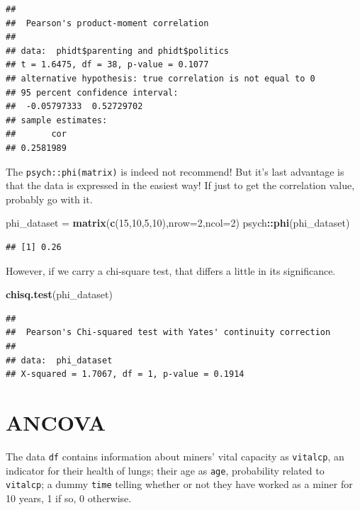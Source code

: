 \documentclass[
]{ctexart}
\newenvironment{Shaded}{\begin{snugshade}}{\end{snugshade}}
\newcommand{\AttributeTok}[1]{\textcolor[rgb]{0.13,0.29,0.53}{#1}}
\newcommand{\DecValTok}[1]{\textcolor[rgb]{0.00,0.00,0.81}{#1}}
\newcommand{\FunctionTok}[1]{\textcolor[rgb]{0.13,0.29,0.53}{\textbf{#1}}}
\newcommand{\NormalTok}[1]{#1}
\newcommand{\OtherTok}[1]{\textcolor[rgb]{0.56,0.35,0.01}{#1}}
\newcommand{\SpecialCharTok}[1]{\textcolor[rgb]{0.81,0.36,0.00}{\textbf{#1}}}
\begin{document}
\begin{verbatim}
## 
##  Pearson's product-moment correlation
## 
## data:  phidt$parenting and phidt$politics
## t = 1.6475, df = 38, p-value = 0.1077
## alternative hypothesis: true correlation is not equal to 0
## 95 percent confidence interval:
##  -0.05797333  0.52729702
## sample estimates:
##       cor 
## 0.2581989
\end{verbatim}

The \texttt{psych::phi(matrix)} is indeed not recommend! But it's last
advantage is that the data is expressed in the easiest way! If just to
get the correlation value, probably go with it.

\begin{Shaded}
\begin{Highlighting}[]
\NormalTok{phi\_dataset }\OtherTok{=} \FunctionTok{matrix}\NormalTok{(}\FunctionTok{c}\NormalTok{(}\DecValTok{15}\NormalTok{,}\DecValTok{10}\NormalTok{,}\DecValTok{5}\NormalTok{,}\DecValTok{10}\NormalTok{),}\AttributeTok{nrow=}\DecValTok{2}\NormalTok{,}\AttributeTok{ncol=}\DecValTok{2}\NormalTok{)}
\NormalTok{psych}\SpecialCharTok{::}\FunctionTok{phi}\NormalTok{(phi\_dataset)}
\end{Highlighting}
\end{Shaded}

\begin{verbatim}
## [1] 0.26
\end{verbatim}

However, if we carry a chi-square test, that differs a little in its
significance.

\begin{Shaded}
\begin{Highlighting}[]
\FunctionTok{chisq.test}\NormalTok{(phi\_dataset)}
\end{Highlighting}
\end{Shaded}

\begin{verbatim}
## 
##  Pearson's Chi-squared test with Yates' continuity correction
## 
## data:  phi_dataset
## X-squared = 1.7067, df = 1, p-value = 0.1914
\end{verbatim}

\hypertarget{ancova}{%
\section{ANCOVA}\label{ancova}}

The data \texttt{df} contains information about miners' vital capacity
as \texttt{vitalcp}, an indicator for their health of lungs; their age
as \texttt{age}, probability related to \texttt{vitalcp}; a dummy
\texttt{time} telling whether or not they have worked as a miner for 10
years, 1 if so, 0 otherwise.
\end{document}
